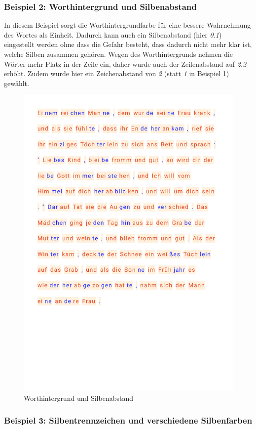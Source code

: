 \subsubsection{Beispiel 2: Worthintergrund und Silbenabstand}

In diesem Beispiel sorgt die Worthintergrundfarbe für eine bessere Wahrnehmung des Wortes als Einheit. Dadurch kann auch ein Silbenabstand (hier \textit{0.1}) eingestellt werden ohne dass die Gefahr besteht, dass dadurch nicht mehr klar ist, welche Silben zusammen gehören. Wegen des Worthintergrunds nehmen die Wörter mehr Platz in der Zeile ein, daher wurde auch der Zeilenabstand auf \textit{2.2} erhöht. Zudem wurde hier ein Zeichenabstand von \textit{2} (statt \textit{1} in Beispiel 1) gewählt.

\begin{figure}[h!]
	\centering
	\includegraphics[width=.7\linewidth, frame]{figures/evaluation/annotation2}
	\caption{Worthintergrund und Silbenabstand}
	\label{fig:evaluation-ex2}
\end{figure}
\newpage

\subsubsection{Beispiel 3:  Silbentrennzeichen und verschiedene Silbenfarben}

